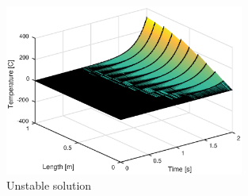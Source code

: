 \begin{figure}[!h]
\centering
\includegraphics[width = 0.7\textwidth]{./unstable.eps}
\caption{Unstable solution }
\label{fig:unstable}
\end{figure}
\FloatBarrier
